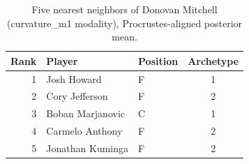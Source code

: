 \begin{table}[htbp]
  \centering\small
  \begin{tabular}{rllc}
    \toprule
    Rank & Player & Position & Archetype \\
    \midrule
    1 & Josh Howard & F & 1 \\
    2 & Cory Jefferson & F & 2 \\
    3 & Boban Marjanovic & C & 1 \\
    4 & Carmelo Anthony & F & 2 \\
    5 & Jonathan Kuminga & F & 2 \\
    \bottomrule
  \end{tabular}
  \caption{Five nearest neighbors of Donovan Mitchell (curvature_m1 modality), Procrustes-aligned posterior mean.}
  \label{tab:Donovan_Mitchell_neighbors_curvature_m1}
\end{table}

